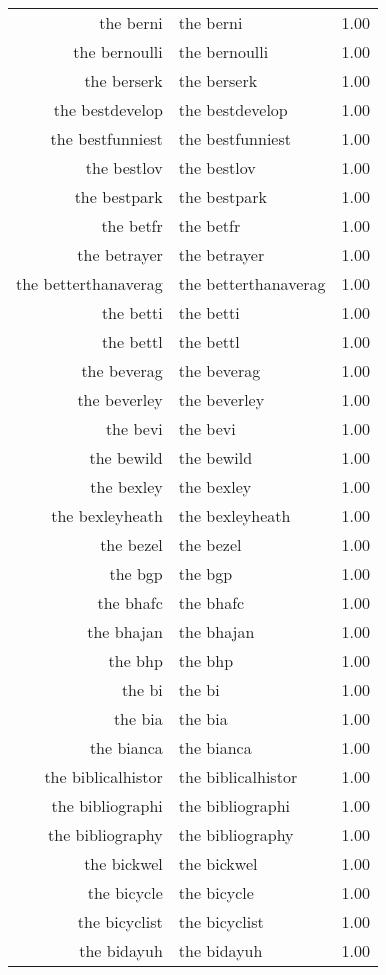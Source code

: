 \begin{table}[ht]
\begin{tabular}{rlr}
  the berni & the berni & 1.00 \\ 
  the bernoulli & the bernoulli & 1.00 \\ 
  the berserk & the berserk & 1.00 \\ 
  the bestdevelop & the bestdevelop & 1.00 \\ 
  the bestfunniest & the bestfunniest & 1.00 \\ 
  the bestlov & the bestlov & 1.00 \\ 
  the bestpark & the bestpark & 1.00 \\ 
  the betfr & the betfr & 1.00 \\ 
  the betrayer & the betrayer & 1.00 \\ 
  the betterthanaverag & the betterthanaverag & 1.00 \\ 
  the betti & the betti & 1.00 \\ 
  the bettl & the bettl & 1.00 \\ 
  the beverag & the beverag & 1.00 \\ 
  the beverley & the beverley & 1.00 \\ 
  the bevi & the bevi & 1.00 \\ 
  the bewild & the bewild & 1.00 \\ 
  the bexley & the bexley & 1.00 \\ 
  the bexleyheath & the bexleyheath & 1.00 \\ 
  the bezel & the bezel & 1.00 \\ 
  the bgp & the bgp & 1.00 \\ 
  the bhafc & the bhafc & 1.00 \\ 
  the bhajan & the bhajan & 1.00 \\ 
  the bhp & the bhp & 1.00 \\ 
  the bi & the bi & 1.00 \\ 
  the bia & the bia & 1.00 \\ 
  the bianca & the bianca & 1.00 \\ 
  the biblicalhistor & the biblicalhistor & 1.00 \\ 
  the bibliographi & the bibliographi & 1.00 \\ 
  the bibliography & the bibliography & 1.00 \\ 
  the bickwel & the bickwel & 1.00 \\ 
  the bicycle & the bicycle & 1.00 \\ 
  the bicyclist & the bicyclist & 1.00 \\ 
  the bidayuh & the bidayuh & 1.00 \\ 

\end{tabular}
\end{table}
